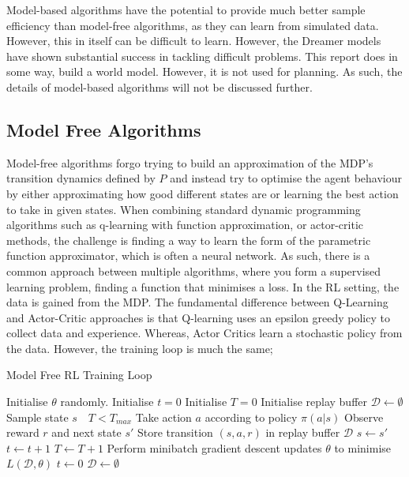 Model-based algorithms have the potential to provide much better sample efficiency than model-free algorithms, as they can learn from simulated data. However, this in itself can be difficult to learn. However, the Dreamer models have shown substantial success in tackling difficult problems\cite{hafner2023mastering,
hafner2020mastering}. This report does in some way, build a world model. However, it is not used for planning. As such, the details of model-based algorithms will not be discussed further.
\subsection{Model Free Algorithms}
Model-free algorithms forgo trying to build an approximation of the MDP's transition dynamics defined by $P$ and instead try to optimise the agent behaviour by either approximating how good different states are or learning the best action to take in given states. When combining standard dynamic programming algorithms such as q-learning with function approximation, or actor-critic methods, the challenge is finding a way to learn the form of the parametric function approximator, which is often a neural network. As such, there is a common approach between multiple algorithms, where you form a supervised learning problem, finding a function that minimises a loss. In the RL setting, the data is gained from the MDP. The fundamental difference between Q-Learning and Actor-Critic approaches is that Q-learning uses an epsilon greedy policy to collect data and experience. Whereas, Actor Critics learn a stochastic policy from the data. However, the training loop is much the same;
\begin{algorithm}
	\caption{Model Free RL Training Loop}
	\begin{algorithmic}
		\State Initialise $\theta$ randomly.
		\State Initialise $t=0$
		\State Initialise $T=0$
		\State Initialise replay buffer $\mathcal{D} \leftarrow \emptyset$
		\State Sample state $s$
		\While $\text{ }T < T_{max}$
		\State Take action $a$ according to policy $\pi(a|s)$
		\State Observe reward $r$ and next state $s'$
		\State Store transition $(s, a, r)$ in replay buffer $\mathcal{D}$
		\State $s \leftarrow s'$
		\State $t \leftarrow t+1$
		\State $T \leftarrow T+1$
		\State Perform minibatch gradient descent updates $\theta$ to minimise $L(\mathcal{D},\theta)$
		\State $t \leftarrow 0$
		\State $\mathcal{D} \leftarrow \emptyset$
		\EndIf

		\EndWhile

	\end{algorithmic}
\end{algorithm}
